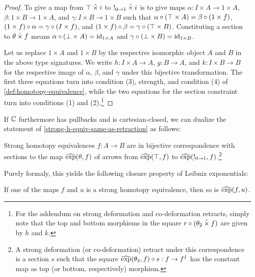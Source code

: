 \documentclass[reqno,10pt,a4paper,oneside]{amsart}
\begin{document}
\begin{proof}
To give a map from $\top \mathbin{\hat{\times}} i$ to $\mathord{!}_{0 \to 1} \mathbin{\hat{\times}} i$ is to give maps $\alpha : I \times A \to 1 \times A$, $\beta : 1 \times B \to 1 \times A$, and $\gamma : I \times B \to 1 \times B$ such that $\alpha \mathbin{\circ} (\top \times A) = \beta \mathbin{\circ} (1 \times f)$, $(1 \times f) \mathbin{\circ} \alpha = \gamma \mathbin{\circ} (I \times f)$, and $(1 \times f) \mathbin{\circ} \beta = \gamma \mathbin{\circ} (\top \times B)$.
Constituting a section to $\theta \mathbin{\hat{\times}} f$ means $\alpha \mathbin{\circ} (\bot \times A) = \operatorname{id}_{1 \times A}$ and $\gamma \mathbin{\circ} (\bot \times B) = \operatorname{id}_{1 \times B}$.

Let us replace $1 \times A$ and $1 \times B$ by the respective isomorphic object $A$ and $B$ in the above type signatures.
We write $h : I \times A \to A$, $g : B \to A$, and $k : I \times B \to B$ for the respective image of $\alpha$, $\beta$, and $\gamma$ under this bijective transformation.
The first three equations turn into condition (3), strength, and condition (4) of \cref{def:homotopy-equivalence}, while the two equations for the section constraint turn into conditions (1) and (2).\footnote{
For the addendum on strong deformation and co-deformation retracts, simply note that the top and bottom morphisms in the square $r \mathbin{\circ} (\theta_2 \mathbin{\hat{\times}} f)$ are given by $h$ and $k$.
}
\end{proof}

If $\mathbb{C}$ furthermore has pullbacks and is cartesian-closed, we can dualize the statement of \cref{strong-h-equiv-same-as-retraction} as follows:

\begin{corollary}
\label{strong-h-equiv-same-as-section}
Strong homotopy equivalences $f : A \to B$ are in bijective correspondence with sections to the map $\operatorname{\widehat{exp}}(\theta, f)$ of arrows from $\operatorname{\widehat{exp}}(\top, f)$ to $\operatorname{\widehat{exp}}(\mathord{!}_{0 \to 1}, f)$.\footnote{
A strong deformation (or co-deformation) retract under this correspondence is a section $s$ such that the square $\operatorname{\widehat{exp}}(\theta_2, f) \mathbin{\circ} s : f \to f^I$ has the constant map as top (or bottom, respectively) morphism.
}
\end{corollary}

Purely formaly, this yields the following closure property of Leibniz exponentials:

\begin{proposition}
\label{strong-h-equiv-closed-under-exp}
If one of the maps $f$ and $u$ is a strong homotopy equivalence, then so is $\operatorname{\widehat{exp}}(f, u)$.
\end{proposition}
\end{document}
